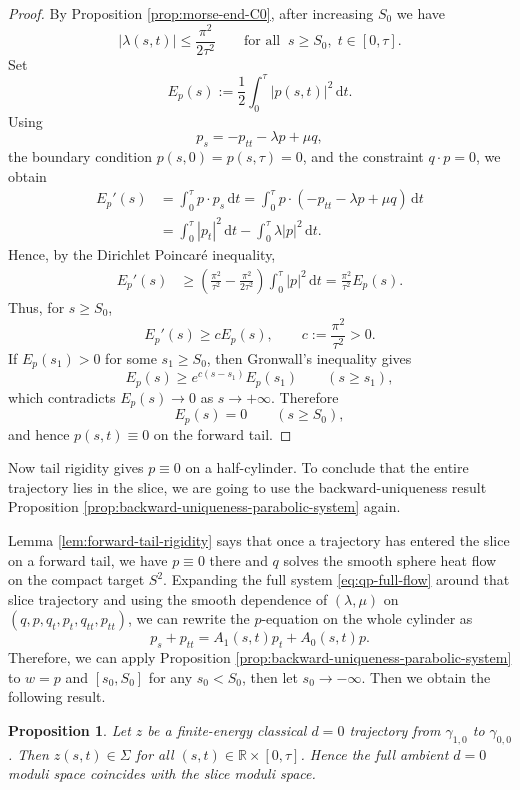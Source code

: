 \documentclass[11pt]{amsart}
\theoremstyle{plain}
\newtheorem{prop}[thm]{Proposition}
\theoremstyle{definition}
\newcommand{\R}{\mathbb{R}}
\newcommand{\dd}{\mathrm d}
\begin{document}
\begin{proof}
By Proposition \ref{prop:morse-end-C0}, after increasing $S_0$ we have
\[
|\lambda(s,t)|\leq \frac{\pi^2}{2\tau^2}
\qquad
\text{for all }~s\geq S_0,\; t\in[0,\tau].
\]
Set
\[
 E_p(s):=\frac12\int_0^\tau |p(s,t)|^2\,\dd t .
\]
Using
\[
 p_s=-p_{tt}-\lambda p+\mu q,
\]
the boundary condition $p(s,0)=p(s,\tau)=0$, and the constraint $q\cdot p=0$,
we obtain
\[
\begin{aligned}
 E_p'(s)
 &=\int_0^\tau p\cdot p_s\,\dd t                                      =\int_0^\tau p\cdot(-p_{tt}-\lambda p+\mu q)\,\dd t                    \\
 &=\int_0^\tau |p_t|^2\,\dd t-\int_0^\tau \lambda |p|^2\,\dd t .
\end{aligned}
\]
Hence, by the Dirichlet Poincaré inequality,
\[
\begin{aligned}
E_p'(s)&\geq
\left(\frac{\pi^2}{\tau^2}-\frac{\pi^2}{2\tau^2}\right)
\int_0^\tau |p|^2\,\dd t=
\frac{\pi^2}{\tau^2} E_p(s).
\end{aligned}
\]
Thus, for $s\geq S_0$,
\[
 E_p'(s)\geq cE_p(s),
 \qquad
 c:=\frac{\pi^2}{\tau^2}>0.
\]
If $E_p(s_1)>0$ for some $s_1\geq S_0$, then Gronwall's inequality gives
\[
 E_p(s)\geq e^{c(s-s_1)}E_p(s_1)
 \qquad
 (s\geq s_1),
\]
which contradicts $E_p(s)\to0$ as $s\to+\infty$. Therefore
\[
 E_p(s)=0
 \qquad
 (s\geq S_0),
\]
and hence $p(s,t)\equiv0$ on the forward tail.
\end{proof}



Now tail rigidity gives $p\equiv 0$ on a half-cylinder. To conclude that the entire trajectory lies in the slice, we are going to use the backward-uniqueness result Proposition \ref{prop:backward-uniqueness-parabolic-system} again.

Lemma \ref{lem:forward-tail-rigidity} says that once a trajectory has entered the slice on a forward tail, we have $p\equiv 0$ there and $q$ solves the smooth sphere heat flow on the compact target $ S^2$. Expanding the full system \eqref{eq:qp-full-flow} around that slice trajectory and using the smooth dependence of $(\lambda,\mu)$ on $(q,p,q_t,p_t,q_{tt},p_{tt})$, we can rewrite the $p$-equation on the whole cylinder as
\[
p_s+p_{tt}=A_1(s,t)p_t+A_0(s,t)p.
\]
Therefore, we can apply Proposition \ref{prop:backward-uniqueness-parabolic-system} to $w=p$ and $[s_0,S_0]$ for any $s_0<S_0$, then let $s_0\rightarrow-\infty$. Then we obtain the following result.


\begin{prop}\label{prop:global-reduction-slice}
Let $z$ be a finite-energy classical $d=0$ trajectory from $\gamma_{1,0}$ to $\gamma_{0,0}$.
Then $z(s,t)\in \Sigma$ for all $(s,t)\in \R\times [0,\tau]$.
Hence the full ambient $d=0$ moduli space coincides with the slice moduli space.
\end{prop}
\end{document}
